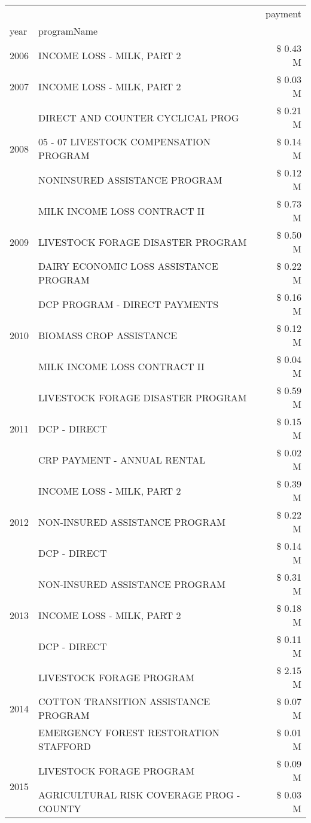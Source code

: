 \begin{tabular}{llr}
\toprule
 &  & payment \\
year & programName &  \\
\midrule
2006 & INCOME LOSS - MILK, PART 2 & \$ 0.43 M \\
\cline{1-3}
2007 & INCOME LOSS - MILK, PART 2 & \$ 0.03 M \\
\cline{1-3}
\multirow[t]{3}{*}{2008} & DIRECT AND COUNTER CYCLICAL PROG & \$ 0.21 M \\
 & 05 - 07 LIVESTOCK COMPENSATION PROGRAM & \$ 0.14 M \\
 & NONINSURED ASSISTANCE PROGRAM & \$ 0.12 M \\
\cline{1-3}
\multirow[t]{3}{*}{2009} & MILK INCOME LOSS CONTRACT II & \$ 0.73 M \\
 & LIVESTOCK FORAGE DISASTER  PROGRAM & \$ 0.50 M \\
 & DAIRY ECONOMIC LOSS ASSISTANCE PROGRAM & \$ 0.22 M \\
\cline{1-3}
\multirow[t]{3}{*}{2010} & DCP PROGRAM - DIRECT PAYMENTS & \$ 0.16 M \\
 & BIOMASS CROP ASSISTANCE & \$ 0.12 M \\
 & MILK INCOME LOSS CONTRACT II & \$ 0.04 M \\
\cline{1-3}
\multirow[t]{3}{*}{2011} & LIVESTOCK FORAGE DISASTER PROGRAM & \$ 0.59 M \\
 & DCP - DIRECT & \$ 0.15 M \\
 & CRP PAYMENT - ANNUAL RENTAL & \$ 0.02 M \\
\cline{1-3}
\multirow[t]{3}{*}{2012} & INCOME LOSS - MILK, PART 2 & \$ 0.39 M \\
 & NON-INSURED ASSISTANCE PROGRAM & \$ 0.22 M \\
 & DCP - DIRECT & \$ 0.14 M \\
\cline{1-3}
\multirow[t]{3}{*}{2013} & NON-INSURED ASSISTANCE PROGRAM & \$ 0.31 M \\
 & INCOME LOSS - MILK, PART 2 & \$ 0.18 M \\
 & DCP - DIRECT & \$ 0.11 M \\
\cline{1-3}
\multirow[t]{3}{*}{2014} & LIVESTOCK FORAGE PROGRAM & \$ 2.15 M \\
 & COTTON TRANSITION ASSISTANCE PROGRAM & \$ 0.07 M \\
 & EMERGENCY FOREST RESTORATION STAFFORD & \$ 0.01 M \\
\cline{1-3}
\multirow[t]{3}{*}{2015} & LIVESTOCK FORAGE PROGRAM & \$ 0.09 M \\
 & AGRICULTURAL RISK COVERAGE PROG - COUNTY & \$ 0.03 M \\

\end{tabular}
